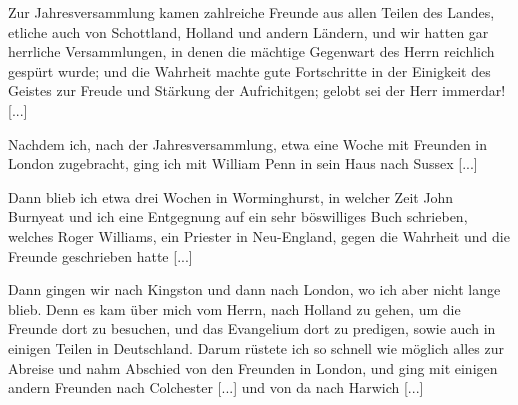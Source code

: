 Zur Jahresversammlung kamen zahlreiche Freunde aus
allen Teilen des Landes, etliche auch von Schottland, Holland
und andern Ländern, und wir hatten gar herrliche Versammlungen,
in denen die mächtige Gegenwart des Herrn reichlich gespürt
wurde; und die Wahrheit machte gute Fortschritte in der Einigkeit
des Geistes zur Freude und Stärkung der Aufrichitgen; 
gelobt sei der Herr immerdar! [...]

Nachdem ich, nach der Jahresversammlung, etwa eine Woche
mit Freunden in London zugebracht, ging ich mit William Penn
in sein Haus nach Sussex [...]

Dann blieb ich etwa drei Wochen in Worminghurst, in
welcher Zeit John Burnyeat 
und ich eine Entgegnung auf ein 
sehr böswilliges Buch schrieben, welches Roger Williams, 
ein Priester in Neu-England, gegen die Wahrheit und die Freunde
geschrieben hatte [...]

Dann gingen wir nach Kingston und dann nach London, wo
ich aber nicht lange blieb. Denn es kam über mich vom Herrn,
nach Holland zu gehen, um die Freunde dort zu besuchen, und
das Evangelium dort zu predigen, sowie auch in einigen Teilen
in Deutschland. Darum rüstete ich so schnell wie möglich alles
zur Abreise und nahm Abschied von den Freunden in London,
und ging mit einigen andern Freunden nach Colchester [...] und
von da nach Harwich [...]
